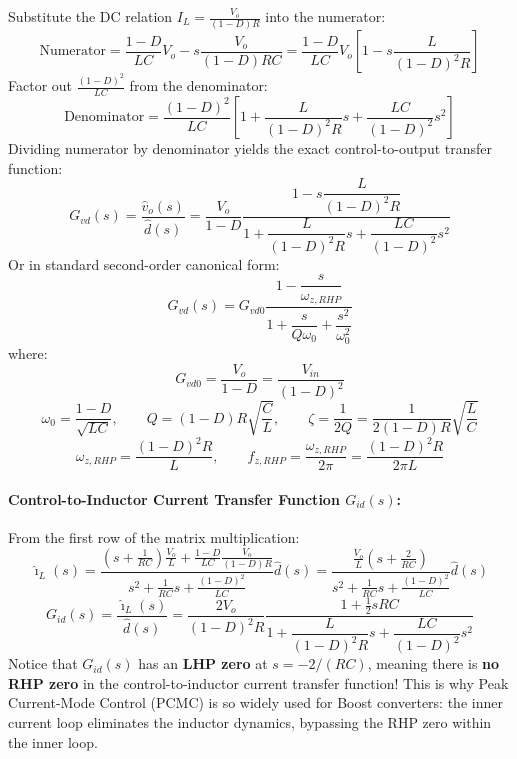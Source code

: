 Substitute the DC relation $I_L = \frac{V_o}{(1-D)R}$ into the numerator:
\begin{equation}
\text{Numerator} = \frac{1-D}{LC} V_o - s \frac{V_o}{(1-D)RC} = \frac{1-D}{LC} V_o \left[ 1 - s \frac{L}{(1-D)^2 R} \right]
\end{equation}
Factor out $\frac{(1-D)^2}{LC}$ from the denominator:
\begin{equation}
\text{Denominator} = \frac{(1-D)^2}{LC} \left[ 1 + \frac{L}{(1-D)^2 R} s + \frac{LC}{(1-D)^2} s^2 \right]
\end{equation}
Dividing numerator by denominator yields the exact control-to-output transfer function:
\begin{equation}
\boxed{G_{vd}(s) = \frac{\hat{v}_o(s)}{\hat{d}(s)} = \frac{V_o}{1-D} \frac{1 - s \dfrac{L}{(1-D)^2 R}}{1 + \dfrac{L}{(1-D)^2 R} s + \dfrac{LC}{(1-D)^2} s^2}}
\end{equation}
Or in standard second-order canonical form:
\begin{equation}
\boxed{G_{vd}(s) = G_{vd0} \frac{1 - \dfrac{s}{\omega_{z,RHP}}}{1 + \dfrac{s}{Q \omega_0} + \dfrac{s^2}{\omega_0^2}}}
\end{equation}
where:
\begin{equation}
\boxed{G_{vd0} = \frac{V_o}{1-D} = \frac{V_{in}}{(1-D)^2}}
\end{equation}
\begin{equation}
\boxed{\omega_0 = \frac{1-D}{\sqrt{LC}}, \qquad Q = (1-D) R \sqrt{\frac{C}{L}}, \qquad \zeta = \frac{1}{2Q} = \frac{1}{2(1-D)R}\sqrt{\frac{L}{C}}}
\end{equation}
\begin{equation}
\boxed{\omega_{z,RHP} = \frac{(1-D)^2 R}{L}, \qquad f_{z,RHP} = \frac{\omega_{z,RHP}}{2\pi} = \frac{(1-D)^2 R}{2\pi L}}
\end{equation}

\paragraph{Control-to-Inductor Current Transfer Function $G_{id}(s)$:}
From the first row of the matrix multiplication:
\begin{equation}
\hat{\imath}_L(s) = \frac{\left(s + \frac{1}{RC}\right)\frac{V_o}{L} + \frac{1-D}{LC} \frac{V_o}{(1-D)R}}{s^2 + \frac{1}{RC} s + \frac{(1-D)^2}{LC}} \hat{d}(s) = \frac{\frac{V_o}{L}\left(s + \frac{2}{RC}\right)}{s^2 + \frac{1}{RC} s + \frac{(1-D)^2}{LC}} \hat{d}(s)
\end{equation}
\begin{equation}
\boxed{G_{id}(s) = \frac{\hat{\imath}_L(s)}{\hat{d}(s)} = \frac{2 V_o}{(1-D)^2 R} \frac{1 + \frac{1}{2} s R C}{1 + \dfrac{L}{(1-D)^2 R} s + \dfrac{LC}{(1-D)^2} s^2}}
\end{equation}
Notice that $G_{id}(s)$ has an \textbf{LHP zero} at $s = -2/(RC)$, meaning there is \textbf{no RHP zero} in the control-to-inductor current transfer function! This is why Peak Current-Mode Control (PCMC) is so widely used for Boost converters: the inner current loop eliminates the inductor dynamics, bypassing the RHP zero within the inner loop.

